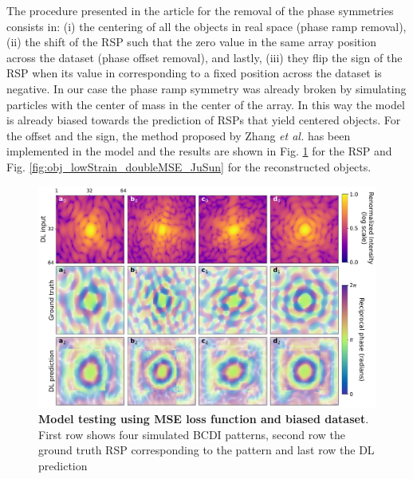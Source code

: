 The procedure presented in the article for the removal of the phase symmetries consists in: (i) the centering of all the 
objects in real space (phase ramp removal), (ii) the shift of the RSP such that the zero value in the same array position 
across the dataset (phase offset removal), and lastly, (iii) they flip the sign of the RSP when its value in corresponding 
to a fixed position across the dataset is negative. In our case the phase ramp symmetry was already broken by simulating 
particles with the center of mass in the center of the array. In this way the model is already biased towards the prediction 
of RSPs that yield centered objects. For the offset and the sign, the method proposed by Zhang \textit{et al.} has been 
implemented in the model and the results are shown in Fig. \ref{fig:RSP_lowStrain_doubleMSE_JuSun} for the RSP and 
Fig. \ref{fig:obj_lowStrain_doubleMSE_JuSun} for the reconstructed objects. 

\begin{figure}[H]
    \centering
    \includegraphics[width=.8\textwidth]{figures/Phasing/RSP_low_strain_doubleMSE_symmJuSun.pdf}
    \caption{\textbf{Model testing using MSE loss function and biased dataset}. First row shows four simulated BCDI patterns, second row the ground truth RSP 
    corresponding to the pattern and last row the DL prediction }
    \label{fig:RSP_lowStrain_doubleMSE_JuSun}
\end{figure}

